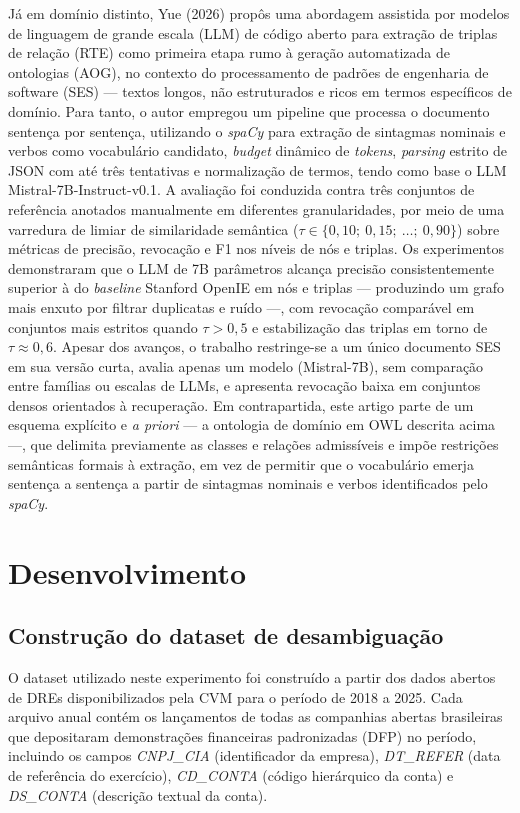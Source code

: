 \documentclass[12pt,a4paper]{article}
\begin{document}
Já em domínio distinto, Yue (2026) propôs uma abordagem assistida por modelos de linguagem de grande escala (LLM) de código aberto para extração de triplas de relação (RTE) como primeira etapa rumo à geração automatizada de ontologias (AOG), no contexto do processamento de padrões de engenharia de software (SES) --- textos longos, não estruturados e ricos em termos específicos de domínio. Para tanto, o autor empregou um pipeline que processa o documento sentença por sentença, utilizando o \textit{spaCy} para extração de sintagmas nominais e verbos como vocabulário candidato, \textit{budget} dinâmico de \textit{tokens}, \textit{parsing} estrito de JSON com até três tentativas e normalização de termos, tendo como base o LLM Mistral-7B-Instruct-v0.1. A avaliação foi conduzida contra três conjuntos de referência anotados manualmente em diferentes granularidades, por meio de uma varredura de limiar de similaridade semântica ($\tau \in \{0{,}10;\ 0{,}15;\ \ldots;\ 0{,}90\}$) sobre métricas de precisão, revocação e F1 nos níveis de nós e triplas. Os experimentos demonstraram que o LLM de 7B parâmetros alcança precisão consistentemente superior à do \textit{baseline} Stanford OpenIE em nós e triplas --- produzindo um grafo mais enxuto por filtrar duplicatas e ruído ---, com revocação comparável em conjuntos mais estritos quando $\tau > 0{,}5$ e estabilização das triplas em torno de $\tau \approx 0{,}6$. Apesar dos avanços, o trabalho restringe-se a um único documento SES em sua versão curta, avalia apenas um modelo (Mistral-7B), sem comparação entre famílias ou escalas de LLMs, e apresenta revocação baixa em conjuntos densos orientados à recuperação. Em contrapartida, este artigo parte de um esquema explícito e \textit{a priori} --- a ontologia de domínio em OWL descrita acima ---, que delimita previamente as classes e relações admissíveis e impõe restrições semânticas formais à extração, em vez de permitir que o vocabulário emerja sentença a sentença a partir de sintagmas nominais e verbos identificados pelo \textit{spaCy}.
\section{Desenvolvimento}

\subsection{Construção do dataset de desambiguação}

O dataset utilizado neste experimento foi construído a partir dos dados abertos de DREs disponibilizados pela CVM para o período de 2018 a 2025. Cada arquivo anual contém os lançamentos de todas as companhias abertas brasileiras que depositaram demonstrações financeiras padronizadas (DFP) no período, incluindo os campos \textit{CNPJ\_CIA} (identificador da empresa), \textit{DT\_REFER} (data de referência do exercício), \textit{CD\_CONTA} (código hierárquico da conta) e \textit{DS\_CONTA} (descrição textual da conta).
\end{document}
